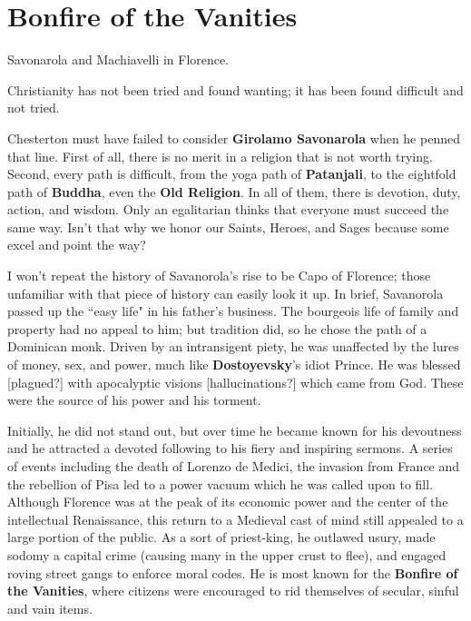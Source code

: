 \section{Bonfire of the Vanities}

Savonarola and Machiavelli in Florence.

\begin{quotex}
Christianity has not been tried and found wanting; it has been found difficult and not tried. 

\end{quotex}
Chesterton must have failed to consider \textbf{Girolamo Savonarola} when he penned that line. First of all, there is no merit in a religion that is not worth trying. Second, every path is difficult, from the yoga path of \textbf{Patanjali}, to the eightfold path of \textbf{Buddha}, even the \textbf{Old Religion}. In all of them, there is devotion, duty, action, and wisdom. Only an egalitarian thinks that everyone must succeed the same way. Isn't that why we honor our Saints, Heroes, and Sages because some excel and point the way?

I won't repeat the history of Savanorola's rise to be Capo of Florence; those unfamiliar with that piece of history can easily look it up. In brief, Savanorola passed up the ``easy life" in his father's business. The bourgeois life of family and property had no appeal to him; but tradition did, so he chose the path of a Dominican monk. Driven by an intransigent piety, he was unaffected by the lures of money, sex, and power, much like \textbf{Dostoyevsky}'s idiot Prince. He was blessed [plagued?] with apocalyptic visions [hallucinations?] which came from God. These were the source of his power and his torment.

Initially, he did not stand out, but over time he became known for his devoutness and he attracted a devoted following to his fiery and inspiring sermons. A series of events including the death of Lorenzo de Medici, the invasion from France and the rebellion of Pisa led to a power vacuum which he was called upon to fill. Although Florence was at the peak of its economic power and the center of the intellectual Renaissance, this return to a Medieval cast of mind still appealed to a large portion of the public. As a sort of priest-king, he outlawed usury, made sodomy a capital crime (causing many in the upper crust to flee), and engaged roving street gangs to enforce moral codes. He is most known for the \textbf{Bonfire of the Vanities}, where citizens were encouraged to rid themselves of secular, sinful and vain items.


